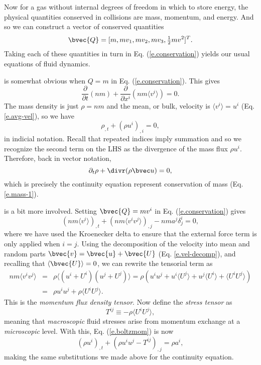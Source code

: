 Now for a gas without internal degrees of freedom in which to store energy, the physical quantities conserved in collisions are mass, momentum, and energy. And so we can construct a vector of conserved quantities
\begin{equation}
  \bvec{Q} = [m, mv_1, mv_2, mv_3, \tfrac{1}{2} mv^2]^T.
\end{equation}
Taking each of these quantities in turn in Eq. (\ref{e.conservation}) yields our usual equations of fluid dynamics.

 is somewhat obvious when $Q=m$ in Eq. (\ref{e.conservation}).
This gives
\[
  \frac{\partial}{\partial t} (nm) + \frac{\partial}{\partial x^i} (nm\langle v^i\rangle) = 0.
\]
The mass density is just $\rho = nm$ and the mean, or bulk, velocity is $\langle v^i\rangle = u^i$ (Eq. \ref{e.avg-vel}), so we have
\begin{equation}
  \rho_{,t} + (\rho u^i)_{,i} = 0,
\end{equation}
in indicial notation.
Recall that repeated indices imply summation and so we recognize the second term on the LHS as the divergence of the mass flux $\rho u^i$.
Therefore, back in vector notation,
\[
  \partial_{t}\rho + \divr(\rho\vu) = 0,
\]
which is precisely the continuity equation represent conservation of mass (Eq. \ref{e.mass-1}).

 is a bit more involved.
Setting $\bvec{Q}=mv^i$ in Eq. (\ref{e.conservation}) gives
\begin{equation}
  (nm\langle v^i\rangle)_{,t} + (nm\langle v^i v^j\rangle)_{,j} - nma^j\delta^i_j = 0, \label{e.boltzmom}
\end{equation}
where we have used the Kroenecker delta to ensure that the external force term is only applied when $i=j$.
Using the decomposition of the velocity into mean and random parts $\bvec{v} = \bvec{u} + \bvec{U}$ (Eq. \ref{e.vel-decomp}), and recalling that $\langle \bvec{U}\rangle=0$, we can rewrite the tensorial term as
\begin{eqnarray}
  nm\langle v^i v^j\rangle &=& \rho\langle(u^i + U^i)(u^j + U^j)\rangle = \rho(u^iu^j + u^i\langle U^j\rangle + u^j\langle U^i \rangle + \langle U^i U^j\rangle)\nonumber\\
  &=& \rho u^i u^j + \rho\langle U^i U^j \rangle.
\end{eqnarray}
This is the {\it momentum flux density tensor}.
Now define the {\it stress tensor} as
\begin{equation}
  T^{ij} \equiv -\rho \langle U^i U^j \rangle,
\end{equation}
meaning that {\it macroscopic} fluid stresses arise from momentum exchange at a {\it microscopic} level.
With this, Eq. (\ref{e.boltzmom}) is now
\begin{equation}
  (\rho u^i)_{,t} + (\rho u^i u^j - T^{ij})_{,j} = \rho a^i,
\end{equation}
making the same substitutions we made above for the continuity equation.

